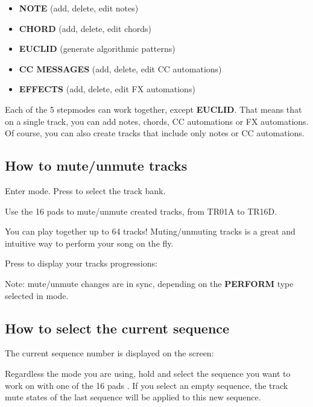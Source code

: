 \begin{itemize}
\item \textbf{NOTE} (add, delete, edit notes)
\item \textbf{CHORD} (add, delete, edit chords)
\item \textbf{EUCLID} (generate algorithmic patterns)
\item \textbf{CC MESSAGES} (add, delete, edit CC automations)
\item \textbf{EFFECTS} (add, delete, edit FX automations)
\end{itemize}

Each of the 5 stepmodes can work together, except \textbf{EUCLID}. That means that on a single track, you can add notes, chords, CC automations or FX automations. Of course, you can also create tracks that include only notes or CC automations.


\subsection{How to mute/unmute tracks}

Enter  mode. Press \btn{<} \btn{>} to select the track bank.

Use the 16 pads \stepbystepicon{} to mute/unmute created tracks, from TR01A to TR16D.

You can play together up to 64 tracks! Muting/unmuting tracks is a great and intuitive way to perform your song on the fly.

Press  to display your tracks progressions:


Note: mute/unmute changes are in sync, depending on the \textbf{PERFORM} type selected in  mode.


\subsection{How to select the current sequence}

The current sequence number is displayed on the screen:


Regardless the mode you are using, hold  and select the sequence you want to work on with one of the 16 pads \stepbystepicon{}. If you select an empty sequence, the track mute states of the last sequence will be applied to this new sequence.


